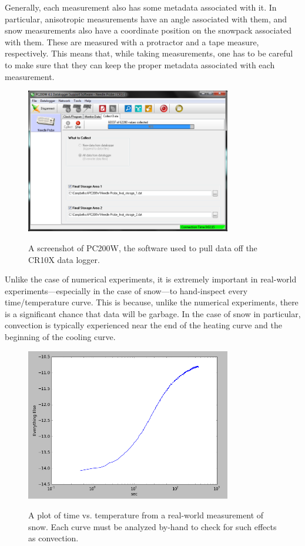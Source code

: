 Generally, each measurement also has some metadata associated with it. In
particular, anisotropic measurements have an angle associated with them, and
snow measurements also have a coordinate position on the snowpack associated
with them. These are measured with a protractor and a tape measure,
respectively. This means that, while taking measurements, one has to be careful
to make sure that they can keep the proper metadata associated with each
measurement.

\begin{figure}[h]
\centering
\includegraphics[width=0.8\textwidth]{fig/pc200w.png}
\label{fig:pc200w}
\caption{A screenshot of PC200W, the software used to pull data off the CR10X data logger.}
\end{figure}

Unlike the case of numerical experiments, it is extremely important in
real-world experiments---especially in the case of snow---to hand-inspect every
time/temperature curve. This is because, unlike the numerical experiments, there
is a significant chance that data will be garbage. In the case of snow in
particular, convection is typically experienced near the end of the heating
curve and the beginning of the cooling curve.

\begin{figure}[h]
\centering
\includegraphics[width=0.8\textwidth]{fig/measurement_graph.png}
\label{fig:meas_graph}
\caption{A plot of time vs. temperature from a real-world measurement of snow.
Each curve must be analyzed by-hand to check for such effects as convection.}
\end{figure}



